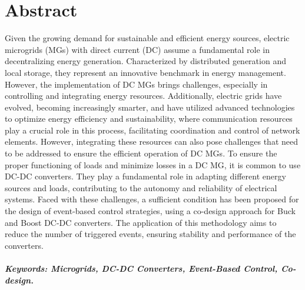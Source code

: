 \chapter*{Abstract}
\thispagestyle{empty}

Given the growing demand for sustainable and efficient energy sources, electric microgrids (MGs) with direct current (DC) assume a fundamental role in decentralizing energy generation. Characterized by distributed generation and local storage, they represent an innovative benchmark in energy management. However, the implementation of DC MGs brings challenges, especially in controlling and integrating energy resources. Additionally, electric grids have evolved, becoming increasingly smarter, and have utilized advanced technologies to optimize energy efficiency and sustainability, where communication resources play a crucial role in this process, facilitating coordination and control of network elements. However, integrating these resources can also pose challenges that need to be addressed to ensure the efficient operation of DC MGs. To ensure the proper functioning of loads and minimize losses in a DC MG, it is common to use DC-DC converters. They play a fundamental role in adapting different energy sources and loads, contributing to the autonomy and reliability of electrical systems. Faced with these challenges, a sufficient condition has been proposed for the design of event-based control strategies, using a co-design approach for Buck and Boost DC-DC converters. The application of this methodology aims to reduce the number of triggered events, ensuring stability and performance of the converters.

\vspace{50pt}



\paragraph{Keywords: Microgrids, DC-DC Converters, Event-Based Control, Co-design.} 


